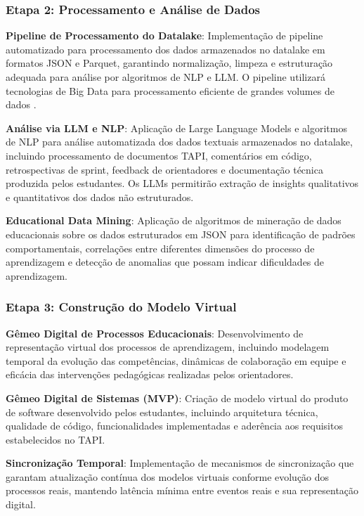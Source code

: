 \documentclass[12pt, a4paper, oneside, brazilian]{abntex2}
\begin{document}
\subsubsection{Etapa 2: Processamento e Análise de Dados}

\textbf{Pipeline de Processamento do Datalake}: Implementação de pipeline automatizado para processamento dos dados armazenados no datalake em formatos JSON e Parquet, garantindo normalização, limpeza e estruturação adequada para análise por algoritmos de NLP e LLM. O pipeline utilizará tecnologias de Big Data para processamento eficiente de grandes volumes de dados \cite{romero2020}.

\textbf{Análise via LLM e NLP}: Aplicação de Large Language Models e algoritmos de NLP para análise automatizada dos dados textuais armazenados no datalake, incluindo processamento de documentos TAPI, comentários em código, retrospectivas de sprint, feedback de orientadores e documentação técnica produzida pelos estudantes. Os LLMs permitirão extração de insights qualitativos e quantitativos dos dados não estruturados.

\textbf{Educational Data Mining}: Aplicação de algoritmos de mineração de dados educacionais \cite{romero2010} sobre os dados estruturados em JSON para identificação de padrões comportamentais, correlações entre diferentes dimensões do processo de aprendizagem e detecção de anomalias que possam indicar dificuldades de aprendizagem.

\subsubsection{Etapa 3: Construção do Modelo Virtual}

\textbf{Gêmeo Digital de Processos Educacionais}: Desenvolvimento de representação virtual dos processos de aprendizagem, incluindo modelagem temporal da evolução das competências, dinâmicas de colaboração em equipe e eficácia das intervenções pedagógicas realizadas pelos orientadores.

\textbf{Gêmeo Digital de Sistemas (MVP)}: Criação de modelo virtual do produto de software desenvolvido pelos estudantes, incluindo arquitetura técnica, qualidade de código, funcionalidades implementadas e aderência aos requisitos estabelecidos no TAPI.

\textbf{Sincronização Temporal}: Implementação de mecanismos de sincronização que garantam atualização contínua dos modelos virtuais conforme evolução dos processos reais, mantendo latência mínima entre eventos reais e sua representação digital.
\end{document}
